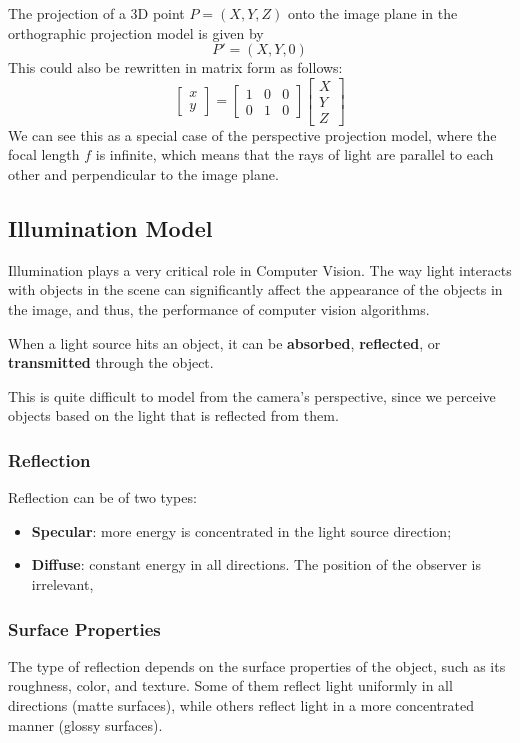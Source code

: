 The projection of a 3D point $P=(X,Y,Z)$ onto the image plane in the orthographic projection model is given by
\[P' = (X, Y, 0)\] This could also be rewritten in matrix form as follows:
\[
    \begin{bmatrix} x \\ y \end{bmatrix} = \begin{bmatrix} 1 & 0 & 0 \\ 0 & 1 & 0 \end{bmatrix} \begin{bmatrix} X \\ Y \\ Z \end{bmatrix}
\]
We can see this as a special case of the perspective projection model, where the focal length $f$ is infinite, which means that the rays of light are parallel to each other and perpendicular to the image plane.

\subsection{Illumination Model}
Illumination plays a very critical role in Computer Vision. 
The way light interacts with objects in the scene can significantly affect the appearance of the objects in the image, and thus, the performance of computer vision algorithms.

When a light source hits an object, it can be \textbf{absorbed}, \textbf{reflected}, or \textbf{transmitted} through the object.

This is quite difficult to model from the camera's perspective, since we perceive objects based on the light that is reflected from them.

\subsubsection{Reflection}
Reflection can be of two types:
\begin{itemize}
    \item \textbf{Specular}: more energy is concentrated in the light source direction;
    \item \textbf{Diffuse}: constant energy in all directions. The position of the observer is irrelevant,
\end{itemize}

\subsubsection{Surface Properties}
The type of reflection depends on the surface properties of the object, such as its roughness, color, and texture.
Some of them reflect light uniformly in all directions (matte surfaces), while others reflect light in a more concentrated manner (glossy surfaces).

